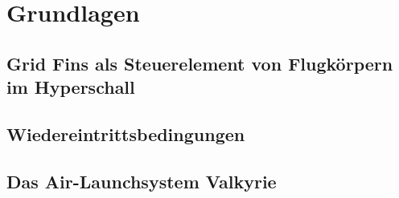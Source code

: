 \chapter{Grundlagen}
\label{sec:grundlagen}

\section{Grid Fins als Steuerelement von Flugkörpern im Hyperschall}

\section{Wiedereintrittsbedingungen}

\section{Das Air-Launchsystem Valkyrie}

